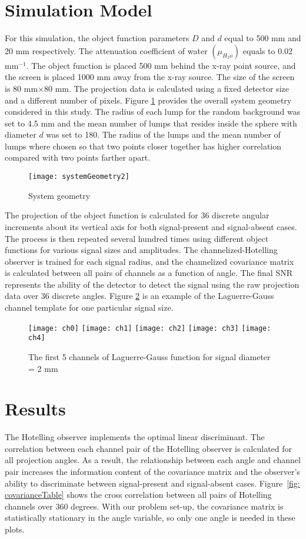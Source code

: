 \section{Simulation Model}
For this simulation, the object function parameters $D$ and $d$ equal to 500 mm and 20 mm respectively.  The attenuation coefficient of water $(\mu_{H_2o})$ equals to 0.02 mm$^{-1}$.  The object function is placed 500 mm behind the x-ray point source, and the screen is placed 1000 mm away from the x-ray source.  The size of the screen is 80 mm$\times$80 mm.  The projection data is calculated using a fixed detector size and a different number of pixels.  Figure \ref{fig:system geometry} provides the overall system geometry considered in this study.  The radius of each lump for the random background was set to 4.5 mm and the mean number of lumps that resides inside the sphere with diameter $d$ was set to 180.  The radius of the lumps and the mean number of lumps where chosen so that two points closer together has higher correlation compared with two points farther apart.
%
\begin{figure}
\texttt{[image: systemGeometry2]}
\caption{System geometry}
\label{fig:system geometry}
\end{figure} 
%
The projection of the object function is calculated for 36 discrete angular increments about its vertical axis for both signal-present and signal-absent cases.  The process is then repeated several hundred times using different object functions for various signal sizes and amplitudes.  The channelized-Hotelling observer is trained for each signal radius, and the channelized covariance matrix is calculated between all pairs of channels as a function of angle.  The final SNR represents the ability of the detector to detect the signal using the raw projection data over 36 discrete angles.  Figure \ref{fig: channel template} is an example of the Laguerre-Gauss channel template for one particular signal size.
%
\begin{figure}[ht]
\texttt{[image: ch0]}
\texttt{[image: ch1]}
\texttt{[image: ch2]}
\texttt{[image: ch3]}
\texttt{[image: ch4]} 
\caption{The first 5 channels of Laguerre-Gauss function for signal diameter = 2 mm}
\label{fig: channel template} 
\end{figure}

\section{Results}
The Hotelling observer implements the optimal linear discriminant. The correlation between each channel pair of the Hotelling observer is calculated for all projection angles.  As a result, the relationship between each angle and channel pair increases the information content of the covariance matrix and the observer's ability to discriminate between signal-present and signal-absent cases. Figure~\ref{fig: covarianceTable} shows the cross correlation between all pairs of Hotelling channels over 360 degrees.  With our problem set-up, the covariance matrix is statistically stationary in the angle variable, so only one angle is needed in these plots.

